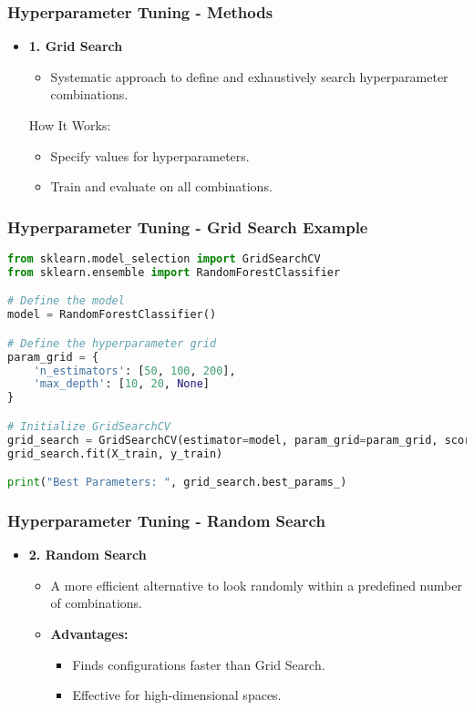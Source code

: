 \documentclass[aspectratio=169]{beamer}
\begin{document}
\begin{frame}[fragile]
    \frametitle{Hyperparameter Tuning - Methods}
    \begin{itemize}
        \item \textbf{1. Grid Search}
        \begin{itemize}
            \item Systematic approach to define and exhaustively search hyperparameter combinations.
        \end{itemize}
        \begin{block}{How It Works:}
            \begin{itemize}
                \item Specify values for hyperparameters.
                \item Train and evaluate on all combinations.
            \end{itemize}
        \end{block}
    \end{itemize}
\end{frame}

\begin{frame}[fragile]
    \frametitle{Hyperparameter Tuning - Grid Search Example}
    \begin{lstlisting}[language=Python]
from sklearn.model_selection import GridSearchCV
from sklearn.ensemble import RandomForestClassifier

# Define the model
model = RandomForestClassifier()

# Define the hyperparameter grid
param_grid = {
    'n_estimators': [50, 100, 200],
    'max_depth': [10, 20, None]
}

# Initialize GridSearchCV
grid_search = GridSearchCV(estimator=model, param_grid=param_grid, scoring='accuracy', cv=5)
grid_search.fit(X_train, y_train)

print("Best Parameters: ", grid_search.best_params_)
    \end{lstlisting}
\end{frame}

\begin{frame}[fragile]
    \frametitle{Hyperparameter Tuning - Random Search}
    \begin{itemize}
        \item \textbf{2. Random Search}
        \begin{itemize}
            \item A more efficient alternative to look randomly within a predefined number of combinations.
            \item \textbf{Advantages:}
            \begin{itemize}
                \item Finds configurations faster than Grid Search.
                \item Effective for high-dimensional spaces.
            \end{itemize}
        \end{itemize}
    \end{itemize}
\end{frame}
\end{document}
